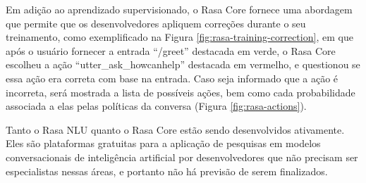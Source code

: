 Em adição ao aprendizado supervisionado, o Rasa Core fornece uma abordagem que permite que os desenvolvedores apliquem correções durante o seu treinamento, como exemplificado na Figura \ref{fig:rasa-training-correction}, em que após o usuário fornecer a entrada ``/greet'' destacada em verde, o Rasa Core escolheu a ação ``utter\_ask\_howcanhelp'' destacada em vermelho, e questionou se essa ação era correta com base na entrada. Caso seja informado que a ação é incorreta, será mostrada a lista de possíveis ações, bem como cada probabilidade associada a elas pelas políticas da conversa (Figura \ref{fig:rasa-actions}).

\begin{figure}[ht] 
   	\captionsetup{width=16cm}
\end{figure}

\begin{figure}[ht] 
   	\captionsetup{width=16cm}
\end{figure}

Tanto o Rasa NLU quanto o Rasa Core estão sendo desenvolvidos ativamente. Eles são plataformas gratuitas para a aplicação de pesquisas em modelos conversacionais de inteligência artificial por desenvolvedores que não precisam ser especialistas nessas áreas, e portanto não há previsão de serem finalizados.